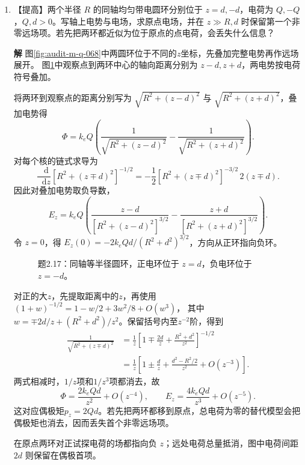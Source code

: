 \documentclass[11pt,openany,fontset=fandol]{ctexbook}
\theoremstyle{plain}\newtheorem{theorem}{定理}[chapter]\newtheorem{proposition}[theorem]{命题}
\theoremstyle{definition}\newtheorem{definition}{定义}[chapter]\newtheorem{example}{例}[chapter]
\theoremstyle{remark}\newtheorem*{remark}{说明}
\newcommand{\SolutionStart}{\par\nobreak\medskip\nobreak\noindent\textbf{解}\quad\ignorespaces}
\newenvironment{solution}{\SolutionStart}{\par\medskip}
\newcommand{\dd}{\mathop{}\!\mathrm d}\newcommand{\ii}{\mathrm i}\newcommand{\ee}{\mathrm e}
\begin{document}
\begin{enumerate}[label=2.\arabic*]
\begin{solution}
杆的横向速度为 $\Omega r$，与横向支持力同向，功率为 $N\Omega r$。这条图上的投影解释了约束力为何做功。
\end{solution}

\item \begin{minipage}[t]{\linewidth}
【提高】两个半径 $R$ 的同轴均匀带电圆环分别位于 $z=d,-d$，电荷为 $Q,-Q$，$Q,d>0$。写轴上电势与电场，求原点电场，并在 $z\gg R,d$ 时保留第一个非零远场项。若先把两环都近似为位于原点的点电荷，会丢失什么信息？

\end{minipage}

\begin{solution}
图\ref{fig:audit-m-q-068}中两圆环位于不同的$z$坐标，先叠加完整电势再作远场展开。
图\ref{fig:ex-2-17}中观察点到两环中心的轴向距离分别为 $z-d,z+d$，两电势按电荷符号叠加。

将两环到观察点的距离分别写为 $\sqrt{R^2+(z-d)^2}$ 与 $\sqrt{R^2+(z+d)^2}$，叠加电势得
\[
\Phi=k_eQ\left(\frac1{\sqrt{R^2+(z-d)^2}}-\frac1{\sqrt{R^2+(z+d)^2}}\right).
\]
对每个核的链式求导为
\[\frac{\dd}{\dd z}[R^2+(z\mp d)^2]^{-1/2}
=-\frac12[R^2+(z\mp d)^2]^{-3/2}\,2(z\mp d).\]
因此对叠加电势取负导数，
\[
E_z=k_eQ\left(\frac{z-d}{[R^2+(z-d)^2]^{3/2}}-
\frac{z+d}{[R^2+(z+d)^2]^{3/2}}\right).
\]
令 $z=0$，得 $E_z(0)=-2k_eQd/(R^2+d^2)^{3/2}$，方向从正环指向负环。

\begin{figure}[H]\centering
{}
\caption{题2.17：同轴等半径圆环，正电环位于 $z=d$，负电环位于 $z=-d$。}\label{fig:ex-2-17}
\end{figure}

对正的大$z$，先提取距离中的$z$，再使用
$(1+w)^{-1/2}=1-w/2+3w^2/8+O(w^3)$，
其中$w=\mp2d/z+(R^2+d^2)/z^2$。保留括号内至$z^{-2}$阶，得到
\begin{align*}
\frac1{\sqrt{R^2+(z\mp d)^2}}
&=\frac1z\left[1\mp\frac{2d}{z}+\frac{R^2+d^2}{z^2}\right]^{-1/2}\\
&=\frac1z\left[1\pm\frac d z+\frac{d^2-R^2/2}{z^2}+O(z^{-3})\right].
\end{align*}
两式相减时，$1/z$项和$1/z^3$项都消去，故
\[
\Phi=\frac{2k_eQd}{z^2}+O(z^{-4}),\qquad
E_z=\frac{4k_eQd}{z^3}+O(z^{-5}).
\]
这对应偶极矩$p_z=2Qd$。若先把两环都移到原点，总电荷为零的替代模型会把偶极矩也消去，因而丢失首个非零远场项。

在原点两环对正试探电荷的场都指向负 $z$；远处电荷总量抵消，图中电荷间距 $2d$ 则保留在偶极首项。
\end{solution}

\end{enumerate}
\end{document}
